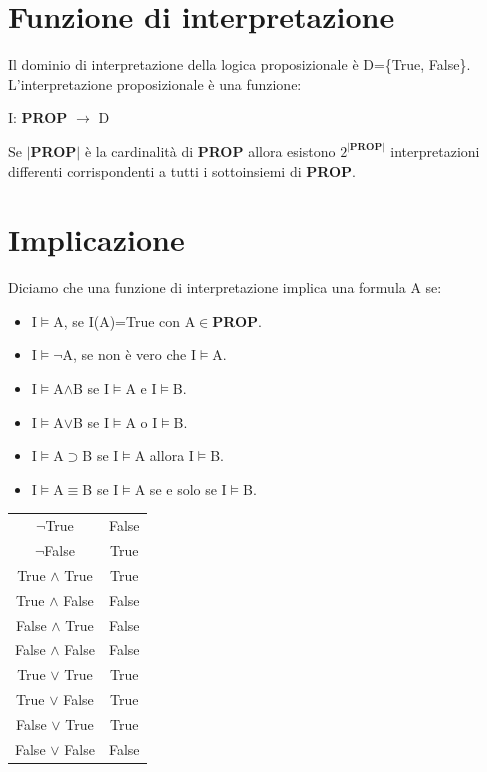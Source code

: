 \documentclass[../main.tex]{subfiles}
\begin{document}
    \section{Funzione di interpretazione}
    Il dominio di interpretazione della logica proposizionale è D=\{True, False\}.\\
    L'interpretazione proposizionale è una funzione:
    \begin{center}
        I: \textbf{PROP} $\to$ D
    \end{center}
    Se $|$\textbf{PROP}$|$ è la cardinalità di \textbf{PROP} allora esistono $2^{|\textbf{PROP}|}$ interpretazioni differenti corrispondenti a tutti i sottoinsiemi di \textbf{PROP}.

    \section{Implicazione}
    Diciamo che una funzione di interpretazione implica una formula A se:
    \begin{itemize}
        \item I$\models$A, se I(A)=True con A$\in$\textbf{PROP}.
        \item I$\models \lnot$A, se non è vero che I$\models$A.
        \item I$\models$A$\land$B se I$\models$A e I$\models$B.
        \item I$\models$A$\lor$B se I$\models$A o I$\models$B.
        \item I$\models$A$\supset$B se I$\models$A allora I$\models$B.
        \item I$\models$A$\equiv$B se I$\models$A se e solo se I$\models$B.
    \end{itemize}
    \begin{minipage}{0.5\textwidth}
        \begin{tabular}{|c|c|}
            \hline
            $\lnot$True & False\\
            $\lnot$False & True\\
            \hline
            True $\land$ True & True\\
            True $\land$ False & False\\
            False $\land$ True & False\\
            False $\land$ False & False\\
            \hline
            True $\lor$ True & True\\
            True $\lor$ False & True\\
            False $\lor$ True & True\\
            False $\lor$ False & False\\
            \hline
        \end{tabular}
    \end{minipage}
\end{document}
